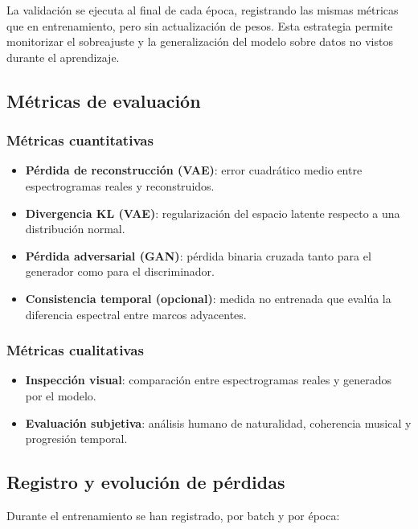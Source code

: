 La validación se ejecuta al final de cada época, registrando las mismas métricas que en entrenamiento, pero sin actualización de pesos. Esta estrategia permite monitorizar el sobreajuste y la generalización del modelo sobre datos no vistos durante el aprendizaje.

\subsection{Métricas de evaluación}

\subsubsection*{Métricas cuantitativas}

\begin{itemize}
    \item \textbf{Pérdida de reconstrucción (VAE)}: error cuadrático medio entre espectrogramas reales y reconstruidos.
    \item \textbf{Divergencia KL (VAE)}: regularización del espacio latente respecto a una distribución normal.
    \item \textbf{Pérdida adversarial (GAN)}: pérdida binaria cruzada tanto para el generador como para el discriminador.
    \item \textbf{Consistencia temporal (opcional)}: medida no entrenada que evalúa la diferencia espectral entre marcos adyacentes.
\end{itemize}

\subsubsection*{Métricas cualitativas}

\begin{itemize}
    \item \textbf{Inspección visual}: comparación entre espectrogramas reales y generados por el modelo.
    \item \textbf{Evaluación subjetiva}: análisis humano de naturalidad, coherencia musical y progresión temporal.
\end{itemize}

\subsection{Registro y evolución de pérdidas}

Durante el entrenamiento se han registrado, por batch y por época:

